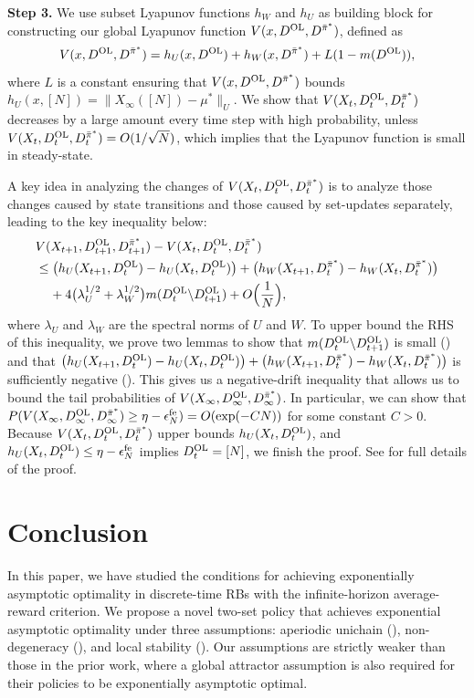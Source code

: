 \documentclass[11pt,letterpaper]{article}
\theoremstyle{plain}
\theoremstyle{definition}
\theoremstyle{remark}
\newcommand{\normplain}[1]{\lVert#1\rVert}
\newcommand{\pibar}{{\sysbar{\pi}}}
\newcommand{\pibs}{{\pibar^*}}
\newcommand{\sysbar}[1]{\bar{#1}}
\newcommand{\statdist}{\mu^*}
\newcommand{\wmat}{W}
\newcommand{\umat}{U}
\newcommand{\errfe}{\epsilon_N^{\text{fe}}}
\newcommand{\hw}{h_\wmat}
\newcommand{\hu}{h_\umat}
\newcommand{\lamw}{\lambda_\wmat}
\newcommand{\lamu}{\lambda_\umat}
\newcommand{\Da}{D^{\pibs}}
\newcommand{\Db}{D^{\textup{OL}}}
\newcommand{\Ltemp}{L}
\begin{document}
\textbf{Step 3.} We use subset Lyapunov functions $\hw$ and $\hu$ as building block for constructing our global Lyapunov function $V(x, \Db, \Da)$, defined as
\begin{equation*}
    V(x, \Db, \Da) = \hu(x, \Db) + \hw(x, \Da) + \Ltemp (1 - m(\Db)),
\end{equation*}
where $L$ is a constant ensuring that $V(x, \Db, \Da)$ bounds $\hu(x, [N]) = \normplain{X_\infty([N]) - \statdist}_\umat$.
We show that $V(X_t, \Db_t, \Da_t)$ decreases by a large amount every time step with high probability,  unless $V(X_t, \Db_t, \Da_t) = O(1/\sqrt{N})$, which implies that the Lyapunov function is small in steady-state. 

A key idea in analyzing the changes of $V(X_t, \Db_t, \Da_t)$ is to analyze those changes caused by state transitions and those caused by set-updates separately, leading to the key inequality below: 
\begin{align}
    \nonumber
    & V(X_{t+1}, \Db_{t+1}, \Da_{t+1}) - V(X_t, \Db_t, \Da_t) \\
    \nonumber
    &\leq \big(\hu(X_{t+1}, \Db_t) - \hu(X_{t}, \Db_t)\big)+ \big(\hw(X_{t+1}, \Da_t) - \hw(X_{t}, \Da_t)\big)\\
    \nonumber
    &\mspace{20mu} + 4\big(\lamu^{1/2} + \lamw^{1/2}\big) m(\Db_t \backslash \Db_{t+1}) + O\Big(\frac{1}{N}\Big),
\end{align}
where $\lamu$ and $\lamw$ are the spectral norms of $\umat$ and $\wmat$. 
To upper bound the RHS of this inequality, we prove two lemmas to show that $m(\Db_t \backslash \Db_{t+1})$ is small () and that $\big(\hu(X_{t+1}, \Db_t) - \hu(X_{t}, \Db_t)\big)+ \big(\hw(X_{t+1}, \Da_t) - \hw(X_{t}, \Da_t)\big)$ is sufficiently negative (). 
This gives us a negative-drift inequality that allows us to bound the tail probabilities of $V(X_\infty, \Db_\infty, \Da_\infty)$. In particular, we can show that $P(V(X_\infty, \Db_\infty, \Da_\infty) \geq \eta - \errfe)  = O(\exp(-CN))$ for some constant $C>0$. Because $V(X_t, \Db_t, \Da_t)$ upper bounds $\hu(X_t, \Db_t)$, and $\hu(X_t, \Db_t) \leq \eta - \errfe$ implies $\Db_t = [N]$, we finish the proof. 
See  for full details of the proof. 



\section{Conclusion}
In this paper, we have studied the conditions for achieving exponentially asymptotic optimality in discrete-time RBs with the infinite-horizon average-reward criterion. We propose a novel two-set policy that achieves exponential asymptotic optimality under three assumptions: aperiodic unichain (), non-degeneracy (), and local stability (). Our assumptions are strictly weaker than those in the prior work, where a global attractor assumption is also required for their policies to be exponentially asymptotic optimal. 
\end{document}
